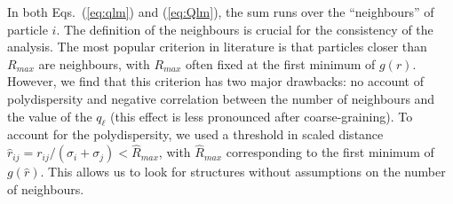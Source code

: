 In both Eqs.~(\ref{eq:qlm}) and (\ref{eq:Qlm}), the sum runs over the ``neighbours'' of particle $i$. The definition of the neighbours is crucial for the consistency of the analysis. The most popular criterion in literature is that particles closer than $R_{max}$ are neighbours, with $R_{max}$ often fixed at the first minimum of $g(r)$. However, we find that this criterion has two major drawbacks: no account of polydispersity and negative correlation between the number of neighbours and the value of the $q_\ell$ (this effect is less pronounced after coarse-graining). To account for the polydispersity, we used a threshold in scaled distance $\hat{r}_{i j} = r_{i j} /(\sigma_i+\sigma_j) < \hat{R}_{max}$, with $\hat{R}_{max}$ corresponding to the first minimum of $g(\hat{r})$. This allows us to look for structures without assumptions on the number of neighbours.


%


